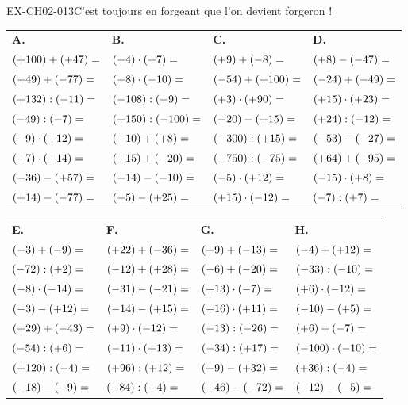 \documentclass[12pt, a4paper]{article}
\begin{document}
\begin{exercice}{EX-CH02-013}{C'est toujours en forgeant que l'on devient forgeron !}

{\small
\bigskip
\def\arraystretch{1.25}
\begin{tabularx}{\linewidth}{*{4}{X}}
\textbf{A.} & \textbf{B.} & \textbf{C.} & \textbf{D.} \\
$(+100)+(+47)= \dotfill$ & $(-4)\cdot(+7)= \dotfill$    & $(+9)+(-8)= \dotfill$      & $(+8)-(-47)= \dotfill$      \\
$(+49)+(-77)= \dotfill$  & $(-8)\cdot(-10)= \dotfill$   & $(-54)+(+100)= \dotfill$   & $(-24)+(-49)= \dotfill$     \\
$(+132):(-11)= \dotfill$ & $(-108):(+9)= \dotfill$      & $(+3)\cdot(+90)= \dotfill$ & $(+15)\cdot(+23)= \dotfill$ \\
$(-49):(-7)= \dotfill$   & $(+150):(-100)= \dotfill$    & $(-20)-(+15)= \dotfill$    & $(+24):(-12)= \dotfill$     \\
$(-9)\cdot(+12)= \dotfill$ & $(-10)+(+8)= \dotfill$     & $(-300):(+15)= \dotfill$   & $(-53)-(-27)= \dotfill$     \\
$(+7)\cdot(+14)= \dotfill$ & $(+15)+(-20)= \dotfill$    & $(-750):(-75)= \dotfill$   & $(+64)+(+95)= \dotfill$     \\
$(-36)-(+57)= \dotfill$  & $(-14)-(-10)= \dotfill$      & $(-5)\cdot(+12)= \dotfill$ & $(-15)\cdot(+8)= \dotfill$  \\
$(+14)-(-77)= \dotfill$  & $(-5)-(+25)= \dotfill$       & $(+15)\cdot(-12)= \dotfill$& $(-7):(+7)= \dotfill$       \\
\end{tabularx}

\bigskip
\begin{tabularx}{\linewidth}{*{4}{X}}
\textbf{E.} & \textbf{F.} & \textbf{G.} & \textbf{H.} \\
$(-3)+(-9)= \dotfill$    & $(+22)+(-36)= \dotfill$      & $(+9)+(-13)= \dotfill$      & $(-4)+(+12)= \dotfill$       \\
$(-72):(+2)= \dotfill$   & $(-12)+(+28)= \dotfill$      & $(-6)+(-20)= \dotfill$      & $(-33):(-10)= \dotfill$      \\
$(-8)\cdot(-14)= \dotfill$ & $(-31)-(-21)= \dotfill$    & $(+13)\cdot(-7)= \dotfill$  & $(+6)\cdot(-12)= \dotfill$   \\
$(-3)-(+12)= \dotfill$   & $(-14)-(+15)= \dotfill$      & $(+16)\cdot(+11)= \dotfill$ & $(-10)-(+5)= \dotfill$       \\
$(+29)+(-43)= \dotfill$  & $(+9)\cdot(-12)= \dotfill$   & $(-13):(-26)= \dotfill$     & $(+6)+(-7)= \dotfill$        \\
$(-54):(+6)= \dotfill$   & $(-11)\cdot(+13)= \dotfill$  & $(-34):(+17)= \dotfill$     & $(-100)\cdot(-10)= \dotfill$ \\
$(+120):(-4)= \dotfill$  & $(+96):(+12)= \dotfill$      & $(+9)-(+32)= \dotfill$      & $(+36):(-4)= \dotfill$       \\
$(-18)-(-9)= \dotfill$   & $(-84):(-4)= \dotfill$       & $(+46)-(-72)= \dotfill$     & $(-12)-(-5)= \dotfill$       \\
\end{tabularx}

}
\end{exercice}
\end{document}
